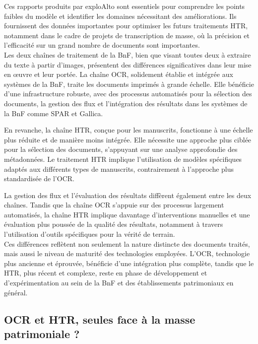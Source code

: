 \documentclass[a4paper,12pt,twoside]{book}
\begin{document}
	Ces rapports produits par exploAlto sont essentiels pour comprendre les points faibles du modèle et identifier les domaines nécessitant des améliorations. Ils fournissent des données importantes pour optimiser les futurs traitements HTR, notamment dans le cadre de projets de transcription de masse, où la précision et l’efficacité sur un grand nombre de documents sont importantes.
	\\
	
	Les deux chaînes de traitement de la BnF, bien que visant toutes deux à extraire du texte à partir d'images, présentent des différences significatives dans leur mise en œuvre et leur portée. La chaîne OCR, solidement établie et intégrée aux systèmes de la BnF, traite les documents imprimés à grande échelle. Elle bénéficie d'une infrastructure robuste, avec des processus automatisés pour la sélection des documents, la gestion des flux et l'intégration des résultats dans les systèmes de la BnF comme SPAR et Gallica.
	
	En revanche, la chaîne HTR, conçue pour les manuscrits, fonctionne à une échelle plus réduite et de manière moins intégrée. Elle nécessite une approche plus ciblée pour la sélection des documents, s'appuyant sur une analyse approfondie des métadonnées. Le traitement HTR implique l'utilisation de modèles spécifiques adaptés aux différents types de manuscrits, contrairement à l'approche plus standardisée de l'OCR.
	
	La gestion des flux et l'évaluation des résultats diffèrent également entre les deux chaînes. Tandis que la chaîne OCR s'appuie sur des processus largement automatisés, la chaîne HTR implique davantage d'interventions manuelles et une évaluation plus poussée de la qualité des résultats, notamment à travers l'utilisation d'outils spécifiques pour la vérité de terrain.
	\\
	
	Ces différences reflètent non seulement la nature distincte des documents traités, mais aussi le niveau de maturité des technologies employées. L'OCR, technologie plus ancienne et éprouvée, bénéficie d'une intégration plus complète, tandis que le HTR, plus récent et complexe, reste en phase de développement et d'expérimentation au sein de la BnF et des établissements patrimoniaux en général.
	\\
	
	\subsection{OCR et HTR, seules face à la masse patrimoniale ? }
	
\end{document}
